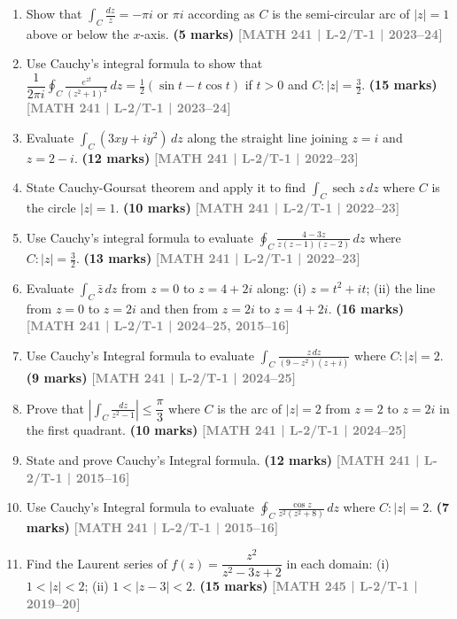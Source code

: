 \documentclass[12pt,a4paper]{article}
\newcommand{\yr}[1]{\hfill\textcolor{gray}{\small\textbf{[#1]}}}
\newcommand{\mk}[1]{\textcolor{orange!70!black}{\small\textbf{(#1 marks)}}}
\begin{document}
\begin{enumerate}
\item Show that $\displaystyle\int_{C}\frac{dz}{z}=-\pi i$ or $\pi i$ according as $C$ is the semi-circular arc of $|z|=1$ above or below the $x$-axis.
\mk{5} \yr{MATH 241 | L-2/T-1 | 2023--24}

\item Use Cauchy's integral formula to show that $\dfrac{1}{2\pi i}\displaystyle\oint_{C}\frac{e^{zt}}{(z^{2}+1)^{2}}\,dz=\tfrac{1}{2}(\sin t - t\cos t)$ if $t>0$ and $C:|z|=\tfrac{3}{2}$.
\mk{15} \yr{MATH 241 | L-2/T-1 | 2023--24}

\item Evaluate $\displaystyle\int_{C}(3xy+iy^{2})\,dz$ along the straight line joining $z=i$ and $z=2-i$.
\mk{12} \yr{MATH 241 | L-2/T-1 | 2022--23}

\item State Cauchy-Goursat theorem and apply it to find $\displaystyle\int_{C}\operatorname{sech}z\,dz$ where $C$ is the circle $|z|=1$.
\mk{10} \yr{MATH 241 | L-2/T-1 | 2022--23}

\item Use Cauchy's integral formula to evaluate $\displaystyle\oint_{C}\frac{4-3z}{z(z-1)(z-2)}\,dz$ where $C:|z|=\tfrac{3}{2}$.
\mk{13} \yr{MATH 241 | L-2/T-1 | 2022--23}

\item Evaluate $\displaystyle\int_{C}\bar{z}\,dz$ from $z=0$ to $z=4+2i$ along: (i) $z=t^{2}+it$; (ii) the line from $z=0$ to $z=2i$ and then from $z=2i$ to $z=4+2i$.
\mk{16} \yr{MATH 241 | L-2/T-1 | 2024--25, 2015--16}

\item Use Cauchy's Integral formula to evaluate $\displaystyle\int_{C}\frac{z\,dz}{(9-z^{2})(z+i)}$ where $C:|z|=2$.
\mk{9} \yr{MATH 241 | L-2/T-1 | 2024--25}

\item Prove that $\left|\displaystyle\int_{C}\frac{dz}{z^{2}-1}\right|\le\dfrac{\pi}{3}$ where $C$ is the arc of $|z|=2$ from $z=2$ to $z=2i$ in the first quadrant.
\mk{10} \yr{MATH 241 | L-2/T-1 | 2024--25}


\item State and prove Cauchy's Integral formula.
\mk{12} \yr{MATH 241 | L-2/T-1 | 2015--16}

\item Use Cauchy's Integral formula to evaluate $\displaystyle\oint_{C}\frac{\cos z}{z^{2}(z^{2}+8)}\,dz$ where $C:|z|=2$.
\mk{7} \yr{MATH 241 | L-2/T-1 | 2015--16}

\item Find the Laurent series of $f(z)=\dfrac{z^{2}}{z^{2}-3z+2}$ in each domain: (i) $1<|z|<2$; (ii) $1<|z-3|<2$.
\mk{15} \yr{MATH 245 | L-2/T-1 | 2019--20}


\end{enumerate}
\end{document}
